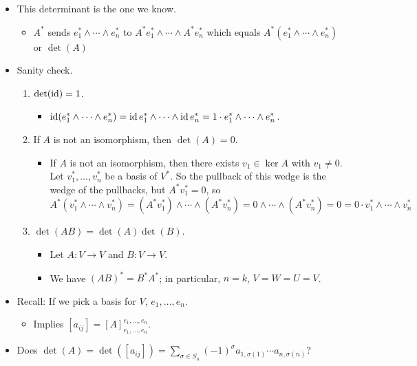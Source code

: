 \documentclass[../notes.tex]{subfiles}
\begin{document}
\begin{itemize}
    \item This determinant is the one we know.
    \begin{itemize}
        \item $A^*$ sends $e_1^*\wedge\cdots\wedge e_n^*$ to $A^*e_1^*\wedge\cdots\wedge A^*e_n^*$ which equals $A^*(e_1^*\wedge\cdots\wedge e_n^*)$ or $\det(A)$
    \end{itemize}
    \item Sanity check.
    \begin{enumerate}
        \item $\det(\operatorname{id})=1$.
        \begin{itemize}
            \item $\operatorname{id}(e_1^*\wedge\cdots\wedge e_n^*)=\operatorname{id} e_1^*\wedge\cdots\wedge\operatorname{id} e_n^*=1\cdot e_1^*\wedge\cdots\wedge e_n^*$.
        \end{itemize}
        \item If $A$ is not an isomorphism, then $\det(A)=0$.
        \begin{itemize}
            \item If $A$ is not an isomorphism, then there exists $v_1\in\ker A$ with $v_1\neq 0$. Let $v_1^*,\dots,v_n^*$ be a basis of $V^*$. So the pullback of this wedge is the wedge of the pullbacks, but $A^*v_1^*=0$, so
            \begin{equation*}
                A^*(v_1^*\wedge\cdots\wedge v_n^*) = (A^*v_1^*)\wedge\cdots\wedge(A^*v_n^*)
                = 0\wedge\cdots\wedge(A^*v_n^*)
                = 0
                = 0\cdot v_1^*\wedge\cdots\wedge v_n^*
            \end{equation*}
        \end{itemize}
        \item $\det(AB)=\det(A)\det(B)$.
        \begin{itemize}
            \item Let $A:V\to V$ and $B:V\to V$.
            \item We have $(AB)^*=B^*A^*$; in particular, $n=k$, $V=W=U=V$.
        \end{itemize}
    \end{enumerate}
    \item Recall: If we pick a basis for $V$, $e_1,\dots,e_n$.
    \begin{itemize}
        \item Implies $[a_{ij}]=[A]_{e_1,\dots,e_n}^{e_1,\dots,e_n}$.
    \end{itemize}
    \item Does $\det(A)=\det([a_{ij}])=\sum_{\sigma\in S_n}(-1)^\sigma a_{1,\sigma(1)}\cdots a_{n,\sigma(n)}$?

\end{itemize}
\end{document}
